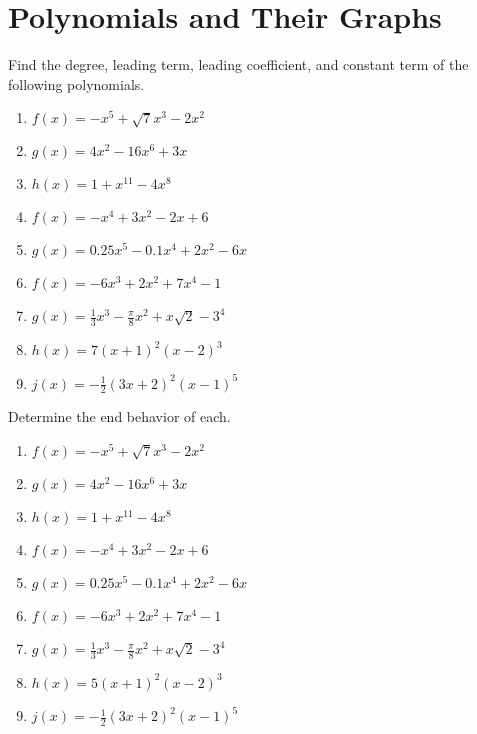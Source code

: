 \chapter{Polynomials and Their Graphs}

Find the degree, leading term, leading coefficient, and constant term of the following polynomials.
\begin{multicols}{3}
\begin{enumerate}
\item $f(x) = -x^5 + \sqrt{7}x^3 - 2x^2$
\item $g(x) = 4x^2 - 16x^6 + 3x$
\item $h(x) = 1 + x^{11} - 4x^8$
\item $f(x) = -x^4+3x^2-2x+6$
\item $g(x) = 0.25x^5-0.1x^4+2x^2-6x$
\item $f(x) = -6x^3 + 2x^2 + 7x^4 - 1$
\item $g(x) = \frac{1}{3}x^3 - \frac{\pi}{8}x^2 + x\sqrt{2} - 3^4$
\item $h(x) = 7(x+1)^2(x-2)^3$
\item $j(x) = -\frac{1}{2}\left(3x+2\right)^2(x-1)^5$
\end{enumerate}		\setcounter{Review}{\value{enumi}}
\end{multicols}
\bigskip

Determine the end behavior of each.
\begin{multicols}{3}
\begin{enumerate}	\setcounter{enumi}{\value{Review}}
\item $f(x) = -x^5 + \sqrt{7}x^3 - 2x^2$
\item $g(x) = 4x^2 - 16x^6 + 3x$
\item $h(x) = 1 + x^{11} - 4x^8$
\item $f(x) = -x^4+3x^2-2x+6$
\item $g(x) = 0.25x^5-0.1x^4+2x^2-6x$
\item $f(x) = -6x^3 + 2x^2 + 7x^4 - 1$
\item $g(x) = \frac{1}{3}x^3 - \frac{\pi}{8}x^2 + x\sqrt{2} - 3^4$
\item $h(x) = 5(x+1)^2(x-2)^3$
\item $j(x) = -\frac{1}{2}\left(3x+2\right)^2(x-1)^5$
\end{enumerate}	\setcounter{Review}{\value{enumi}}
\end{multicols}
\bigskip

